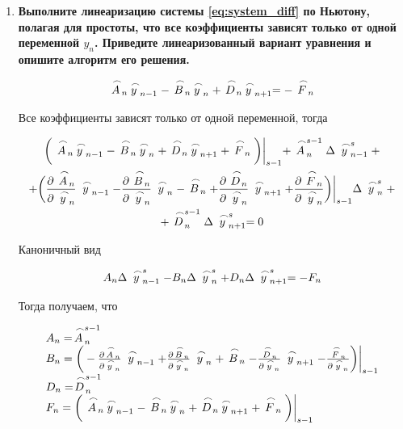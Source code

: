 \begin{enumerate}
    \item \textbf{Выполните линеаризацию системы \ref{eq:system_diff} по Ньютону, полагая для простоты, что все коэффициенты зависят только от одной переменной $y_n$. Приведите линеаризованный вариант уравнения и опишите алгоритм его решения.}

    \begin{equation*}
        \LittleCap{A}_n \LittleCap{y}_{n-1} - \LittleCap{B}_n \LittleCap{y}_n + \LittleCap{D}_n \LittleCap{y}_{n+1} = -\LittleCap{F}_n
    \end{equation*}

    Все коэффициенты зависят только от одной переменной, тогда

    \begin{multline*}
        \bigg( \LittleCap{A}_n \LittleCap{y}_{n-1} - \LittleCap{B}_n \LittleCap{y}_n + \LittleCap{D}_n \LittleCap{y}_{n+1} + \LittleCap{F}_n \bigg) \bigg|_{s-1} + \LittleCap{A}_n^{s-1} \Delta \LittleCap{y}_{n-1}^{s} + \\
        + \bigg( \frac{\partial \LittleCap{A}_n}{\partial \LittleCap{y}_n} \LittleCap{y}_{n-1} - \frac{\partial \LittleCap{B}_n}{\partial \LittleCap{y}_n} \LittleCap{y}_n - \LittleCap{B}_n + \frac{\partial \LittleCap{D}_n}{\partial \LittleCap{y}_n} \LittleCap{y}_{n+1} + \frac{\partial \LittleCap{F}_n}{\partial \LittleCap{y}_n} \bigg) \bigg|_{s-1} \Delta \LittleCap{y}_{n}^s + \\
        + \LittleCap{D}_n^{s-1} \Delta \LittleCap{y}_{n+1}^s = 0
    \end{multline*}

    Каноничный вид

    \begin{equation*}
        A_n \Delta \LittleCap{y}_{n-1}^s - B_n \Delta\LittleCap{y}_n^s + D_n \Delta \LittleCap{y}_{n+1}^s = -F_n
    \end{equation*}

    Тогда получаем, что

    \begin{equation*}
        \begin{matrix*}[l]
            A_n = \LittleCap{A}_n^{s-1} \\
            B_n = \bigg( -\frac{\partial \LittleCap{A}_n}{\partial \LittleCap{y}_n} \LittleCap{y}_{n-1} + \frac{\partial \LittleCap{B}_n}{\partial \LittleCap{y}_n} \LittleCap{y}_n + \LittleCap{B}_n - \frac{\LittleCap{D}_n}{\partial \LittleCap{y}_n} \LittleCap{y}_{n+1} - \frac{\LittleCap{F}_n}{\partial \LittleCap{y}_n} \bigg) \bigg|_{s-1} \\
            D_n = \LittleCap{D}_n^{s-1} \\
            F_n = \bigg( \LittleCap{A}_n \LittleCap{y}_{n-1} - \LittleCap{B}_n \LittleCap{y}_n + \LittleCap{D}_n \LittleCap{y}_{n+1} + \LittleCap{F}_n \bigg) \bigg|_{s-1} \\
        \end{matrix*}
    \end{equation*}


\end{enumerate}
